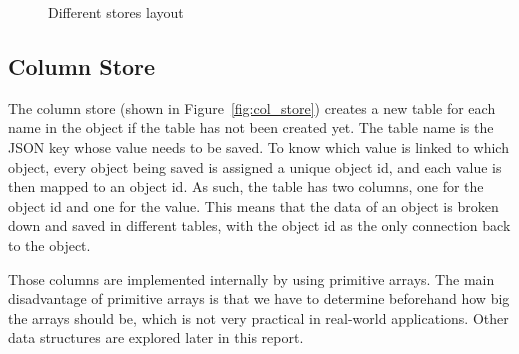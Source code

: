\documentclass[11pt,journal,compsoc]{IEEEtran}
\begin{document}
\begin{figure}
\captionsetup{justification=centering}
\centerline{
\hfill
{}
\hfill
{}}
\caption{Different stores layout}
\label{fig:stores}
\end{figure} 


\subsection{Column Store}
\label{sub:col_store}
The column store (shown in Figure~\ref{fig:col_store}) creates a new table for each name in the object if the table has not been created yet. The table name is the JSON key whose value needs to be saved. To know which value is linked to which object, every object being saved is assigned a unique object id, and each value is then mapped to an object id. As such, the table has two columns, one for the object id and one for the value. This means that the data of an object is broken down and saved in different tables, with the object id as the only connection back to the object.

Those columns are implemented internally by using primitive arrays. The main disadvantage of primitive arrays is that we have to determine beforehand how big the arrays should be, which is not very practical in real-world applications. Other data structures are explored later in this report.
\end{document}
